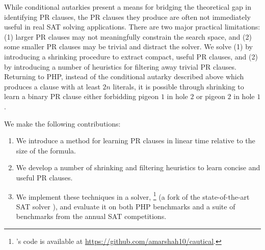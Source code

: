 While conditional autarkies present a means for bridging the theoretical gap in
identifying PR clauses, the PR clauses they produce are often not immediately useful
in real SAT solving applications. There are two major practical limitations: (1)
larger PR clauses may not meaningfully constrain the search space, and (2) some
smaller PR clauses may be trivial and distract the solver. We solve (1) by
introducing a shrinking procedure to extract compact, useful PR clauses, and
(2) by introducing a number of heuristics for filtering away trivial PR
clauses. Returning to PHP, instead of the conditional autarky described above
which produces a clause with at least $2n$ literals, it is possible through
shrinking to learn a binary PR clause either forbidding pigeon $1$ in hole $2$ or
pigeon $2$ in hole $1$.


We make the following contributions: 

\begin{enumerate} 
    \item We introduce a method for learning PR clauses in linear time relative to the
    size of the formula. 
    \item We develop a number of shrinking and filtering heuristics to learn
    concise and useful PR clauses.%
    \item We implement these techniques in a solver, \tool\footnote{\tool's code
    is available at \url{https://github.com/amarshah10/cautical}.} (a fork of
    the state-of-the-art SAT solver \cadical), and evaluate it on both PHP benchmarks 
    and a suite of benchmarks from the annual SAT competitions.
\end{enumerate}